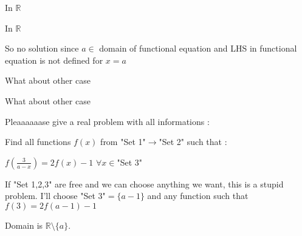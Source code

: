 \begin{solution}
	In $\mathbb{R}$
\end{solution}



\begin{solution}
	\begin{tcolorbox}In $\mathbb{R}$\end{tcolorbox}
So no solution since $a\in$ domain of functional equation and LHS in functional equation is not defined for $x=a$
\end{solution}



\begin{solution}
	What about other case
\end{solution}



\begin{solution}
	\begin{tcolorbox}What about other case\end{tcolorbox}
Pleaaaaaase give a real problem with all informations :

Find all functions $f(x)$ from "Set 1"$\to$"Set 2" such that :

   $f(\frac{3}{a-x})=2f(x)-1$  $\forall x\in$"Set 3"

If "Set 1,2,3" are free and we can choose anything we want, this is a stupid problem.
I'll choose "Set 3"$=\{a-1\}$ and any function such that $f(3)=2f(a-1)-1$
\end{solution}



\begin{solution}
	Domain is $\mathbb{R} \setminus \{a\}$.
\end{solution}



